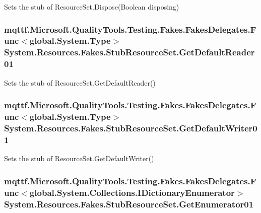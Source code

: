 Sets the stub of Resource\-Set.\-Dispose(\-Boolean disposing)

\hypertarget{class_system_1_1_resources_1_1_fakes_1_1_stub_resource_set_a36053e7cc669f73a9da012fa38be4bdf}{
\subsubsection[{Get\-Default\-Reader01}]{\setlength{\rightskip}{0pt plus 5cm}mqttf.\-Microsoft.\-Quality\-Tools.\-Testing.\-Fakes.\-Fakes\-Delegates.\-Func$<$global.\-System.\-Type$>$ System.\-Resources.\-Fakes.\-Stub\-Resource\-Set.\-Get\-Default\-Reader01}}\label{class_system_1_1_resources_1_1_fakes_1_1_stub_resource_set_a36053e7cc669f73a9da012fa38be4bdf}


Sets the stub of Resource\-Set.\-Get\-Default\-Reader()

\hypertarget{class_system_1_1_resources_1_1_fakes_1_1_stub_resource_set_a0bd8041c45fda542738d739f8f7b20ef}{
\subsubsection[{Get\-Default\-Writer01}]{\setlength{\rightskip}{0pt plus 5cm}mqttf.\-Microsoft.\-Quality\-Tools.\-Testing.\-Fakes.\-Fakes\-Delegates.\-Func$<$global.\-System.\-Type$>$ System.\-Resources.\-Fakes.\-Stub\-Resource\-Set.\-Get\-Default\-Writer01}}\label{class_system_1_1_resources_1_1_fakes_1_1_stub_resource_set_a0bd8041c45fda542738d739f8f7b20ef}


Sets the stub of Resource\-Set.\-Get\-Default\-Writer()

\hypertarget{class_system_1_1_resources_1_1_fakes_1_1_stub_resource_set_aeccbfaf9c015875fa6a8853de8a50ba5}{
\subsubsection[{Get\-Enumerator01}]{\setlength{\rightskip}{0pt plus 5cm}mqttf.\-Microsoft.\-Quality\-Tools.\-Testing.\-Fakes.\-Fakes\-Delegates.\-Func$<$global.\-System.\-Collections.\-I\-Dictionary\-Enumerator$>$ System.\-Resources.\-Fakes.\-Stub\-Resource\-Set.\-Get\-Enumerator01}}\label{class_system_1_1_resources_1_1_fakes_1_1_stub_resource_set_aeccbfaf9c015875fa6a8853de8a50ba5}


